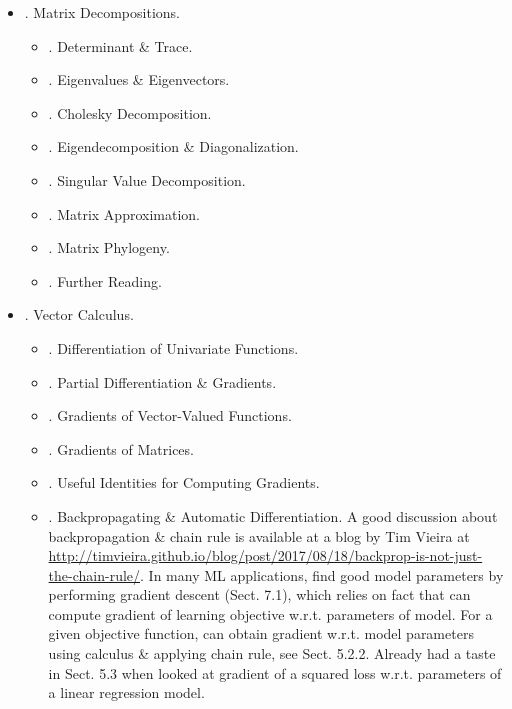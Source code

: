 \documentclass{article}
\begin{document}
\begin{itemize}
	\item {. Matrix Decompositions.}
	\begin{itemize}
		\item {. Determinant \& Trace.}
		\item {. Eigenvalues \& Eigenvectors.}
		\item {. Cholesky Decomposition.}
		\item {. Eigendecomposition \& Diagonalization.}
		\item {. Singular Value Decomposition.}
		\item {. Matrix Approximation.}
		\item {. Matrix Phylogeny.}
		\item {. Further Reading.}
	\end{itemize}
	\item {. Vector Calculus.}
	\begin{itemize}
		\item {. Differentiation of Univariate Functions.}
		\item {. Partial Differentiation \& Gradients.}
		\item {. Gradients of Vector-Valued Functions.}
		\item {. Gradients of Matrices.}
		\item {. Useful Identities for Computing Gradients.}
		\item {. Backpropagating \& Automatic Differentiation.} A good discussion about backpropagation \& chain rule is available at a blog by {\sc Tim Vieira} at \url{http://timvieira.github.io/blog/post/2017/08/18/backprop-is-not-just-the-chain-rule/}. In many ML applications, find good model parameters by performing gradient descent (Sect. 7.1), which relies on fact that can compute gradient of learning objective w.r.t. parameters of model. For a given objective function, can obtain gradient w.r.t. model parameters using calculus \& applying chain rule, see Sect. 5.2.2. Already had a taste in Sect. 5.3 when looked at gradient of a squared loss w.r.t. parameters of a linear regression model.
		

\end{itemize}
\end{itemize}
\end{document}
